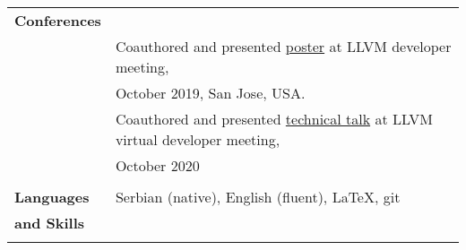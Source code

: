 \documentclass[letterpaper,11pt,oneside]{article}
\begin{document}
\begin{tabular}{@{} l l}
     
     \Large {}\textbf{{Conferences}} \\
     & Coauthored and presented \href{https://llvm.org/devmtg/2019-10/talk-abstracts.html#post4}{poster} at LLVM developer meeting, \\
     & October 2019, San Jose, USA. \\
     & Coauthored and presented \href{https://whova.com/embedded/speaker/llvm_202010/11649941/}{technical talk} at LLVM virtual developer meeting, \\
     & October 2020 \\
     & \\
     


  \Large {}\textbf{{Languages}}   & Serbian (native), English (fluent), \LaTeX, git \\
\Large {}\textbf{{and Skills}} \\
& \\

\end{tabular}
\end{document}
